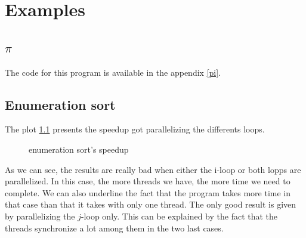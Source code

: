\chapter{Examples}

\section{$\pi$}

The code for this program is available in the appendix \ref{pi}.

\section{Enumeration sort}

The plot \ref{enumsort_plot} presents the speedup got parallelizing the differents loops.

\begin{figure}[!h]
  \begin{center}
  \end{center}
  \caption{enumeration sort's speedup}
  \label{enumsort_plot}
\end{figure} 

As we can see, the results are really bad when either the i-loop or both lopps are parallelized. In this case, the more threads we have, the more time we need to complete. We can also underline the fact that the program takes more time in that case than that it takes with only one thread. The only good result is given by parallelizing the $j$-loop only. This can be explained by the fact that the threads synchronize a lot among them in the two last cases.\\

